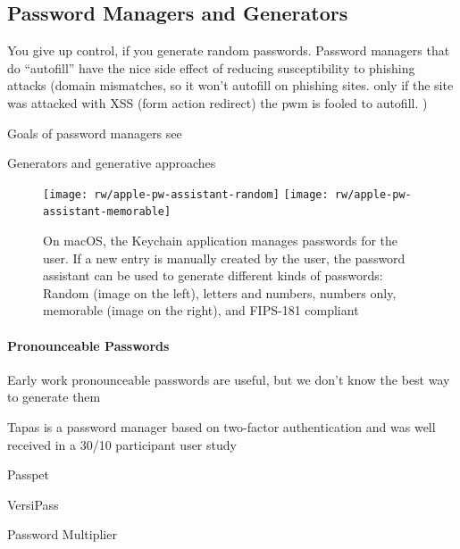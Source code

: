 	
	\subsection{Password Managers and Generators}\label{sec:rw:pwm_generators}
	
	You give up control, if you generate random passwords. 
	Password managers that do ``autofill'' have the nice side effect of reducing susceptibility to phishing attacks (domain mismatches, so it won't autofill on phishing sites. only if the site was attacked with XSS (form action redirect) the pwm is fooled to autofill. )
	
	Goals of password managers see \cite{Yee2006Passpet}
	
	Generators and generative approaches
	\begin{figure}
		\centering
		\texttt{[image: rw/apple-pw-assistant-random]}
		\texttt{[image: rw/apple-pw-assistant-memorable]}
		\caption{\label{fig:rw:pw_generators} On macOS, the Keychain application manages passwords for the user. If a new entry is manually created by the user, the password assistant can be used to generate different kinds of passwords: Random (image on the left), letters and numbers, numbers only, memorable (image on the right), and FIPS-181 compliant}
	\end{figure}
	
	\paragraph{Pronounceable Passwords}
	Early work 
	pronounceable passwords are useful, but we don't know the best way to generate them \cite{Goldberg2015UnspeakablePasswords}
	
	
	Tapas is a password manager based on two-factor authentication and was well received in a 30/10 participant user study \cite{McCarney2012Tapas, McCarney2013PWMThesis}
	
	Passpet \cite{Yee2006Passpet}
	
	VersiPass \cite{Stobert2014PWMThatDoesntRemember}
	
	Password Multiplier \cite{Halderman2005ConvenientPWM}
	
